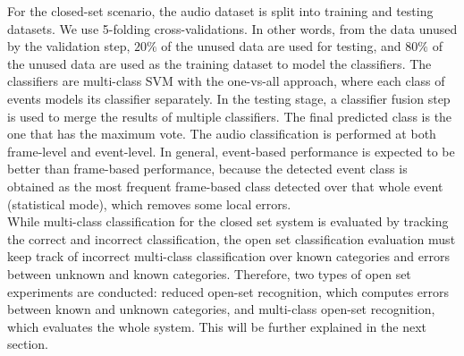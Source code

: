 \documentclass{ieeeaccess}
\begin{document}
For the closed-set scenario, the audio dataset is split into training and testing datasets. We use 5-folding cross-validations. In other words, from the data unused by the validation step, $20\%$ of the unused data are used for testing, and $80\%$ of the unused data are used as the training dataset to model the classifiers. The classifiers are multi-class SVM with the one-vs-all approach, where each class of events models its classifier separately. In the testing stage, a classifier fusion step is used to merge the results of multiple classifiers. The final predicted class is the one that has the maximum vote. The audio classification is performed at both frame-level and event-level. In general, event-based performance is expected to be better than frame-based performance, because the detected event class is obtained as the most frequent frame-based class detected over that whole event (statistical mode), which removes some local errors.\\
While multi-class classification for the closed set system is evaluated by tracking the correct and incorrect classification, the open set classification evaluation must keep track of incorrect multi-class classification over known categories and errors between unknown and known categories. Therefore, two types of open set experiments are conducted: reduced open-set recognition, which computes errors between known and unknown categories, and multi-class open-set recognition, which evaluates the whole system. This will be further explained in the next section.
\end{document}
